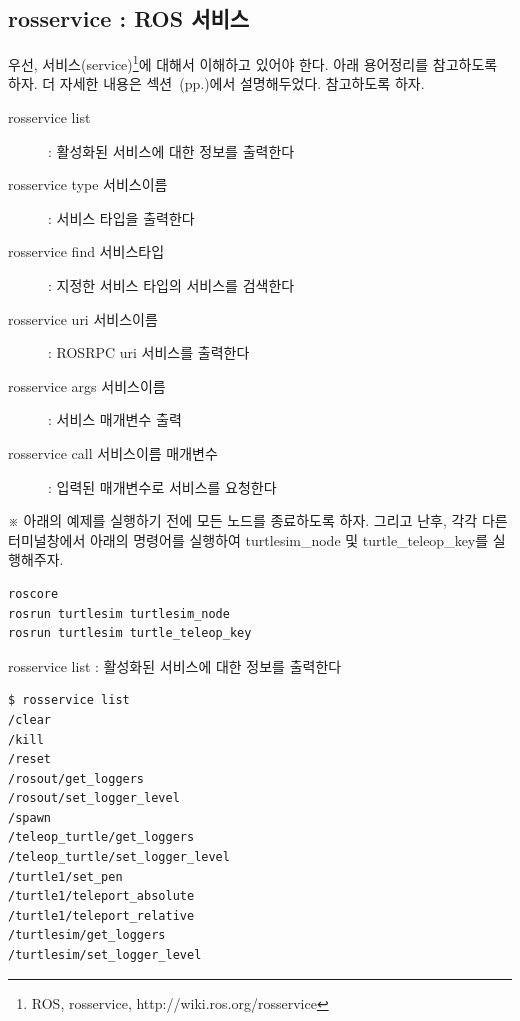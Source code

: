 \newpage
\subsection{rosservice : ROS 서비스}

우선, 서비스(service)\footnote{ROS, rosservice, http://wiki.ros.org/rosservice}에 대해서 이해하고 있어야 한다. 아래 용어정리를 참고하도록 하자. 더 자세한 내용은 섹션~(pp.\pageref{def:RosService})에서 설명해두었다. 참고하도록 하자.

\vspace{\baselineskip}
\noindent
\begin{description}
\item[rosservice list] : 활성화된 서비스에 대한 정보를 출력한다
\item[rosservice type 서비스이름] : 서비스 타입을 출력한다
\item[rosservice find 서비스타입] : 지정한 서비스 타입의 서비스를 검색한다
\item[rosservice uri  서비스이름] : ROSRPC uri 서비스를 출력한다
\item[rosservice args 서비스이름] : 서비스 매개변수 출력
\item[rosservice call 서비스이름 매개변수] : 입력된 매개변수로 서비스를 요청한다
\end{description}

\vspace{\baselineskip}
\noindent
※ 아래의 예제를 실행하기 전에 모든 노드를 종료하도록 하자. 그리고 난후, 각각 다른 터미널창에서 아래의 명령어를 실행하여 turtlesim\_node 및 turtle\_teleop\_key를 실행해주자.

\begin{lstlisting}[language=ROS]
roscore
rosrun turtlesim turtlesim_node 
rosrun turtlesim turtle_teleop_key
\end{lstlisting}

\setcounter{num}{0}

\vspace{\baselineskip}
\noindent
{}\circled{\thenum} rosservice list : 활성화된 서비스에 대한 정보를 출력한다

\begin{lstlisting}[language=ROS]
$ rosservice list
/clear
/kill
/reset
/rosout/get_loggers
/rosout/set_logger_level
/spawn
/teleop_turtle/get_loggers
/teleop_turtle/set_logger_level
/turtle1/set_pen
/turtle1/teleport_absolute
/turtle1/teleport_relative
/turtlesim/get_loggers
/turtlesim/set_logger_level
\end{lstlisting}

